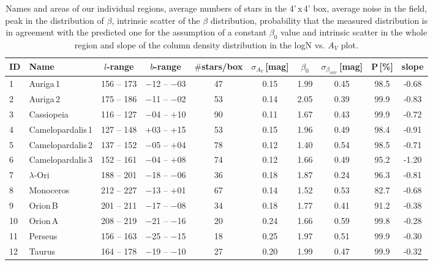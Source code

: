 \documentclass[useAMS,usenatbib]{mn2e}
\begin{document}
\begin{table}
\caption{\label{tab_beta} Names and areas of our individual regions, average
numbers of stars in the 4'\,x\,4' box, average noise in the field, peak in the
distribution of $\beta$, intrinsic scatter of the $\beta$ distribution,
probability that the measured distribution is in agreement with the predicted
one for the assumption of a constant $\beta_0$ value and intrinsic scatter in
the whole region and slope of the column density distribution in the logN vs.
$A_V$ plot.}   
\begin{center}
\begin{tabular}{llllcccccc}
ID & Name & \multicolumn{1}{c}{$l$-range} & \multicolumn{1}{c}{$b$-range} &
\multicolumn{1}{c}{$\#$stars/box} & 
\multicolumn{1}{c}{$\sigma_{A_V}$\,[mag]} & \multicolumn{1}{c}{$\beta_0$} &
\multicolumn{1}{c}{$\sigma_{\beta_{intr}}$\,[mag]} & \multicolumn{1}{c}{P\,[\%]} &
\multicolumn{1}{c}{slope} \\ \hline 
 1 & Auriga\,1         & 156 -- 173 & $-$12 -- $-$03 & 47 & 0.15 & 1.99 & 0.45 & 98.5 & -0.68 \\
 2 & Auriga\,2         & 175 -- 186 & $-$11 -- $-$02 & 53 & 0.14 & 2.05 & 0.39 & 99.9 & -0.83 \\
 3 & Cassiopeia        & 116 -- 127 & $-$04 -- $+$10 & 90 & 0.11 & 1.67 & 0.43 & 99.9 & -0.72 \\
 4 & Camelopardalis\,1 & 127 -- 148 & $+$03 -- $+$15 & 53 & 0.15 & 1.96 & 0.49 & 98.4 & -0.91 \\
 5 & Camelopardalis\,2 & 137 -- 152 & $-$05 -- $+$04 & 78 & 0.12 & 1.40 & 0.54 & 98.5 & -0.71 \\
 6 & Camelopardalis\,3 & 152 -- 161 & $-$04 -- $+$08 & 74 & 0.12 & 1.66 & 0.49 & 95.2 & -1.20 \\ 
 7 & $\lambda$-Ori     & 188 -- 201 & $-$18 -- $-$06 & 36 & 0.18 & 1.87 & 0.24 & 96.3 & -0.81 \\
 8 & Monoceros         & 212 -- 227 & $-$13 -- $+$01 & 67 & 0.14 & 1.52 & 0.53 & 82.7 & -0.68 \\
 9 & Orion\,B          & 201 -- 211 & $-$17 -- $-$08 & 34 & 0.18 & 1.77 & 0.41 & 91.2 & -0.38 \\
10 & Orion\,A          & 208 -- 219 & $-$21 -- $-$16 & 20 & 0.24 & 1.66 & 0.59 & 99.8 & -0.28 \\
11 & Perseus           & 156 -- 163 & $-$25 -- $-$15 & 18 & 0.25 & 1.97 & 0.51 & 99.9 & -0.30 \\
12 & Taurus            & 164 -- 178 & $-$19 -- $-$10 & 27 & 0.20 & 1.99 & 0.47 & 99.9 & -0.32 \\

\end{tabular}
\end{center}
\end{table}
\end{document}
